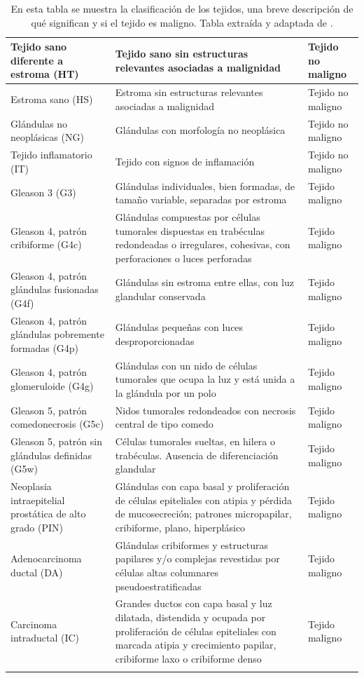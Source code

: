 \begin{longtable}{|p{4cm}|p{8cm}|p{3cm}|}
Tejido sano diferente a estroma (HT) & Tejido sano sin estructuras relevantes asociadas a malignidad & Tejido no maligno \\
\hline
Estroma sano (HS) & Estroma sin estructuras relevantes asociadas a malignidad & Tejido no maligno \\
\hline
Glándulas no neoplásicas (NG) & Glándulas con morfología no neoplásica & Tejido no maligno \\
\hline
Tejido inflamatorio (IT) & Tejido con signos de inflamación &  Tejido no maligno \\
\hline
Gleason 3 (G3) & Glándulas individuales, bien formadas, de tamaño variable, separadas por estroma &  Tejido maligno \\
\hline
Gleason 4, patrón cribiforme (G4c) & Glándulas compuestas por células tumorales dispuestas en trabéculas redondeadas o irregulares, cohesivas, con perforaciones o luces perforadas &  Tejido maligno \\
\hline
Gleason 4, patrón glándulas fusionadas (G4f) & Glándulas sin estroma entre ellas, con luz glandular conservada & Tejido maligno \\
\hline
Gleason 4, patrón glándulas pobremente formadas (G4p) & Glándulas pequeñas con luces desproporcionadas & Tejido maligno \\
\hline
Gleason 4, patrón glomeruloide (G4g) & Glándulas con un nido de células tumorales que ocupa la luz y está unida a la glándula por un polo &  Tejido maligno \\
\hline
Gleason 5, patrón comedonecrosis (G5c) & Nidos tumorales redondeados con necrosis central de tipo comedo & Tejido maligno \\
\hline
Gleason 5, patrón sin glándulas definidas (G5w) & Células tumorales sueltas, en hilera o trabéculas. Ausencia de diferenciación glandular &  Tejido maligno \\
\hline
Neoplasia intraepitelial prostática de alto grado (PIN) & Glándulas con capa basal y proliferación de células epiteliales con atipia y pérdida de mucosecreción; patrones micropapilar, cribiforme, plano, hiperplásico & Tejido maligno \\
\hline
Adenocarcinoma ductal (DA) & Glándulas cribiformes y estructuras papilares y/o complejas revestidas por células altas columnares pseudoestratificadas & Tejido maligno \\
\hline
Carcinoma intraductal (IC) & Grandes ductos con capa basal y luz dilatada, distendida y ocupada por proliferación de células epiteliales con marcada atipia y crecimiento papilar, cribiforme laxo o cribiforme denso &  Tejido maligno \\
\hline

\caption{En esta tabla se muestra la clasificación de los tejidos, una breve descripción de qué significan y si el tejido es maligno. Tabla extraída y adaptada de \cite{datosObtencion}.} \label{tab:datasetClases} 
\end{longtable}



